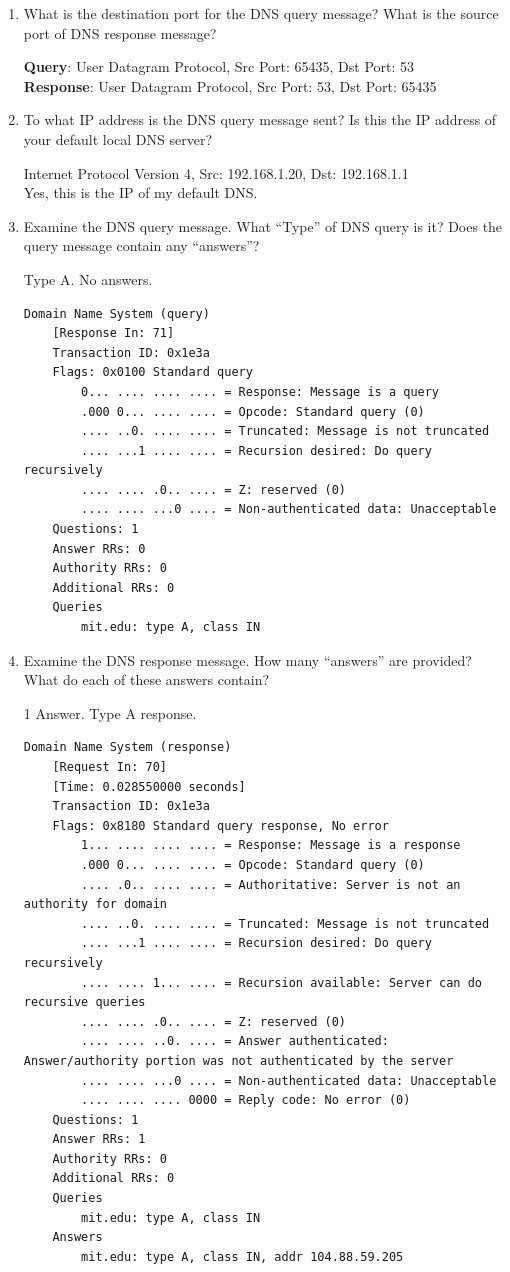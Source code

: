 \documentclass[letter,10pt]{article}
\begin{document}
\begin{enumerate}
\item What is the destination port for the DNS query message? What is the source port
of DNS response message?

\textbf{Query}: User Datagram Protocol, Src Port: 65435, Dst Port: 53 \\
\textbf{Response}: User Datagram Protocol, Src Port: 53, Dst Port: 65435

\item To what IP address is the DNS query message sent? Is this the IP address of your
default local DNS server?

Internet Protocol Version 4, Src: 192.168.1.20, Dst: 192.168.1.1 \\
Yes, this is the IP of my default DNS.


\item Examine the DNS query message. What “Type” of DNS query is it? Does the
query message contain any “answers”?

Type A. No answers.

\begin{verbatim}
Domain Name System (query)
    [Response In: 71]
    Transaction ID: 0x1e3a
    Flags: 0x0100 Standard query
        0... .... .... .... = Response: Message is a query
        .000 0... .... .... = Opcode: Standard query (0)
        .... ..0. .... .... = Truncated: Message is not truncated
        .... ...1 .... .... = Recursion desired: Do query recursively
        .... .... .0.. .... = Z: reserved (0)
        .... .... ...0 .... = Non-authenticated data: Unacceptable
    Questions: 1
    Answer RRs: 0
    Authority RRs: 0
    Additional RRs: 0
    Queries
        mit.edu: type A, class IN

\end{verbatim}

\item Examine the DNS response message. How many “answers” are provided? What
do each of these answers contain?

1 Answer. Type A response.

\begin{verbatim}
Domain Name System (response)
    [Request In: 70]
    [Time: 0.028550000 seconds]
    Transaction ID: 0x1e3a
    Flags: 0x8180 Standard query response, No error
        1... .... .... .... = Response: Message is a response
        .000 0... .... .... = Opcode: Standard query (0)
        .... .0.. .... .... = Authoritative: Server is not an authority for domain
        .... ..0. .... .... = Truncated: Message is not truncated
        .... ...1 .... .... = Recursion desired: Do query recursively
        .... .... 1... .... = Recursion available: Server can do recursive queries
        .... .... .0.. .... = Z: reserved (0)
        .... .... ..0. .... = Answer authenticated: Answer/authority portion was not authenticated by the server
        .... .... ...0 .... = Non-authenticated data: Unacceptable
        .... .... .... 0000 = Reply code: No error (0)
    Questions: 1
    Answer RRs: 1
    Authority RRs: 0
    Additional RRs: 0
    Queries
        mit.edu: type A, class IN
    Answers
        mit.edu: type A, class IN, addr 104.88.59.205
\end{verbatim}


\end{enumerate}
\end{document}
